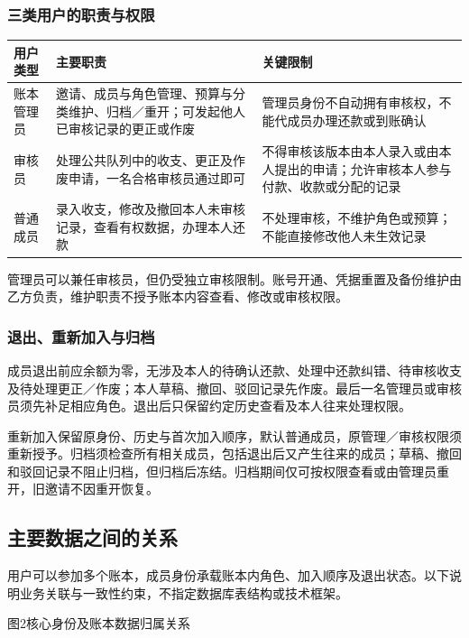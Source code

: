 \documentclass[UTF8,a4paper,11pt,fontset=fandol]{ctexart}
\renewcommand{\arraystretch}{1.3}
\newcommand{\smalltable}{\small\setlength{\tabcolsep}{5pt}\renewcommand{\arraystretch}{1.25}}
\newcommand{\captionline}[1]{{\par\centering\small\color{muted}#1\par}}
\begin{document}
\subsubsection{三类用户的职责与权限}
\begin{center}\smalltable
\begin{tabularx}{\linewidth}{p{21mm}YY}
\toprule
{}用户类型 & 主要职责 & 关键限制\\
\midrule
账本管理员 & 邀请、成员与角色管理、预算与分类维护、归档／重开；可发起他人已审核记录的更正或作废 & 管理员身份不自动拥有审核权，不能代成员办理还款或到账确认\\
审核员 & 处理公共队列中的收支、更正及作废申请，一名合格审核员通过即可 & 不得审核该版本由本人录入或由本人提出的申请；允许审核本人参与付款、收款或分配的记录\\
普通成员 & 录入收支，修改及撤回本人未审核记录，查看有权数据，办理本人还款 & 不处理审核，不维护角色或预算；不能直接修改他人未生效记录\\
\bottomrule
\end{tabularx}
\end{center}
管理员可以兼任审核员，但仍受独立审核限制。账号开通、凭据重置及备份维护由乙方负责，维护职责不授予账本内容查看、修改或审核权限。

\subsubsection{退出、重新加入与归档}
成员退出前应余额为零，无涉及本人的待确认还款、处理中还款纠错、待审核收支及待处理更正／作废；本人草稿、撤回、驳回记录先作废。最后一名管理员或审核员须先补足相应角色。退出后只保留约定历史查看及本人往来处理权限。

重新加入保留原身份、历史与首次加入顺序，默认普通成员，原管理／审核权限须重新授予。归档须检查所有相关成员，包括退出后又产生往来的成员；草稿、撤回和驳回记录不阻止归档，但归档后冻结。归档期间仅可按权限查看或由管理员重开，旧邀请不因重开恢复。

\newpage
\subsection{主要数据之间的关系}
用户可以参加多个账本，成员身份承载账本内角色、加入顺序及退出状态。以下说明业务关联与一致性约束，不指定数据库表结构或技术框架。

\begin{center}
\end{center}
\captionline{图2\quad 核心身份及账本数据归属关系}
\end{document}
